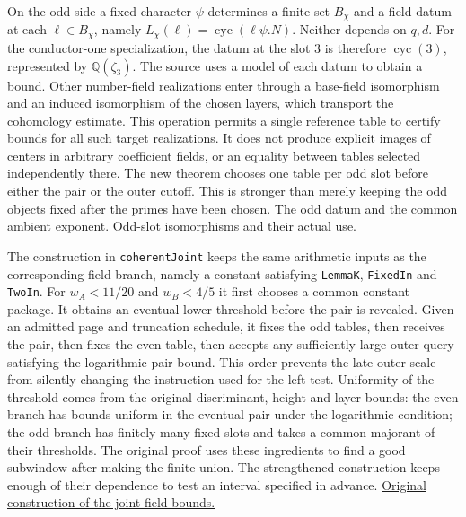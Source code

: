 \documentclass[12pt,letterpaper]{article}
\begin{document}
On the odd side a fixed character $\psi$ determines a finite set $B_\chi$ and a field datum at each $\ell\in B_\chi$, namely $L_\chi(\ell)=\operatorname{cyc}(\ell\psi.N)$. Neither depends on $q,d$. For the conductor-one specialization, the datum at the slot $3$ is therefore $\operatorname{cyc}(3)$, represented by $\mathbb Q(\zeta_3)$. The source uses a model of each datum to obtain a bound. Other number-field realizations enter through a base-field isomorphism and an induced isomorphism of the chosen layers, which transport the cohomology estimate. This operation permits a single reference table to certify bounds for all such target realizations. It does not produce explicit images of centers in arbitrary coefficient fields, or an equality between tables selected independently there. The new theorem chooses one table per odd slot before either the pair or the outer cutoff. This is stronger than merely keeping the odd objects fixed after the primes have been chosen. \href{https://github.com/nousentllc/riemann-hypothesis/blob/40e56bab026552e089d7afcfeff08d2defb9c005/src/Development/AutomorphicArithmetic/AutomorphicVarieties/PrimeSetBoundDataOfPrimitiveChar.lean#L69-L77}{The odd datum and the common ambient exponent.} \href{https://github.com/nousentllc/riemann-hypothesis/blob/40e56bab026552e089d7afcfeff08d2defb9c005/src/Development/AutomorphicArithmetic/AutomorphicVarieties/LayeredIsomorphisms/PartB.lean#L50-L94}{Odd-slot isomorphisms and their actual use.}

The construction in \texttt{coherentJoint} keeps the same arithmetic inputs as the corresponding field branch, namely a constant satisfying \texttt{LemmaK}, \texttt{FixedIn} and \texttt{TwoIn}. For $w_A<11/20$ and $w_B<4/5$ it first chooses a common constant package. It obtains an eventual lower threshold before the pair is revealed. Given an admitted page and truncation schedule, it fixes the odd tables, then receives the pair, then fixes the even table, then accepts any sufficiently large outer query satisfying the logarithmic pair bound. This order prevents the late outer scale from silently changing the instruction used for the left test. Uniformity of the threshold comes from the original discriminant, height and layer bounds: the even branch has bounds uniform in the eventual pair under the logarithmic condition; the odd branch has finitely many fixed slots and takes a common majorant of their thresholds. The original proof uses these ingredients to find a good subwindow after making the finite union. The strengthened construction keeps enough of their dependence to test an interval specified in advance. \href{https://github.com/nousentllc/riemann-hypothesis/blob/40e56bab026552e089d7afcfeff08d2defb9c005/src/Development/AutomorphicArithmetic/AutomorphicVarieties/LayeredIsomorphisms/ThmBabOf.lean#L11-L97}{Original construction of the joint field bounds.}
\end{document}
